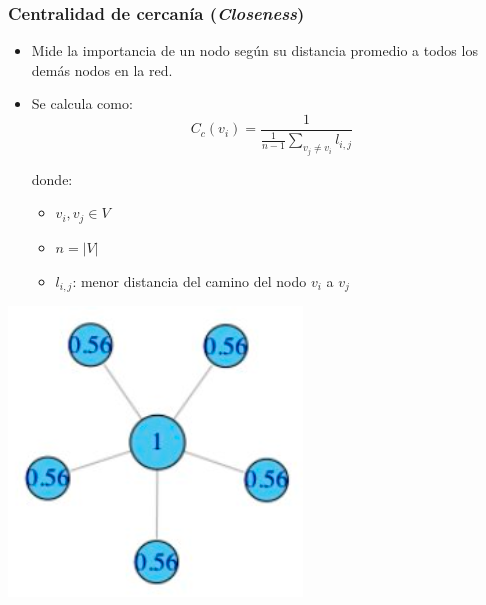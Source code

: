 \documentclass[
10pt, %
aspectratio=169, %
]{beamer}
\begin{document}
	\begin{frame}
		
		\frametitle{Centralidad de cercanía (\emph{Closeness})}
		
		\begin{minipage}{0.45\textwidth}
			
			\begin{itemize}
				\item Mide la importancia de un nodo según su distancia promedio a todos los demás nodos en la red. 
				
				\item Se calcula como:
				$$C_c(v_i) = \frac{1}{\frac{1}{n-1} \sum_{v_j \neq v_i} l_{i,j}}$$
				
				donde:
				\begin{itemize}
					\item $v_i, v_j \in V$
					\item $n = |V|$
					\item $l_{i, j}$: menor distancia del camino del nodo $v_i$ a $v_j$
				\end{itemize}
				
			\end{itemize}
			
		\end{minipage}%
		\hfill
		\begin{minipage}{0.45\textwidth}
			
			\centering
			\includegraphics[scale=0.4]{centralidad-cercania.png}
			
		\end{minipage}%
		
	\end{frame}
	
\end{document}
